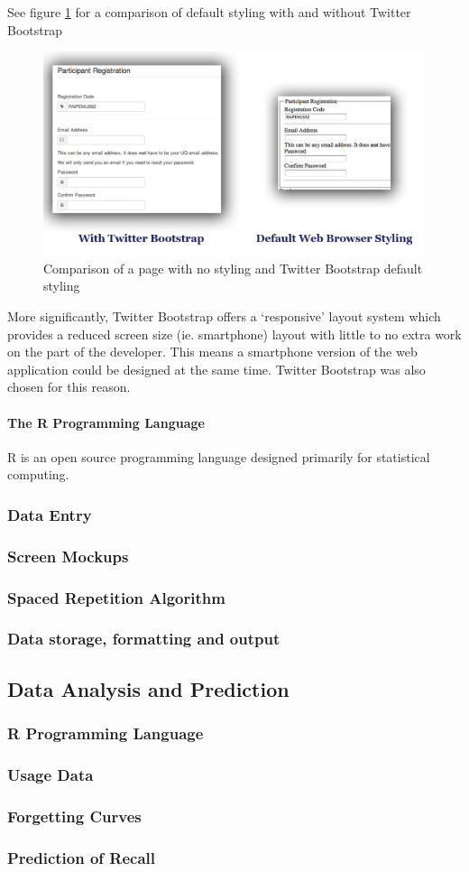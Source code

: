 See figure \ref{twitterbootstrap} for a comparison of default styling with and without Twitter Bootstrap
\begin{figure}[h!]
\includegraphics[width=120mm]{img/twitterbootstrap.jpg}
\caption{Comparison of a page with no styling and Twitter Bootstrap default styling}
\label{twitterbootstrap}
\end{figure}

More significantly, Twitter Bootstrap offers a `responsive' layout 
system which provides a reduced screen size (ie. smartphone) layout
 with little to no extra work on the part of the developer. This 
 means a smartphone version of the web application could be designed
  at the same time. Twitter Bootstrap was also chosen for this reason.
  
\paragraph{The R Programming Language}
R is an open source programming language designed primarily for statistical computing. 

\subsubsection{Data Entry}
\subsubsection{Screen Mockups}
\subsubsection{Spaced Repetition Algorithm}
\subsubsection{Data storage, formatting and output}

\subsection{Data Analysis and Prediction}
\subsubsection{R Programming Language}
\subsubsection{Usage Data}
\subsubsection{Forgetting Curves}
\subsubsection{Prediction of Recall}